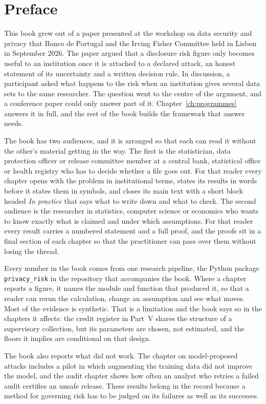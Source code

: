 \chapter{Preface}

This book grew out of a paper presented at the workshop on data security and
privacy that Banco de Portugal and the Irving Fisher Committee held in Lisbon in
September 2026. The paper argued that a disclosure risk figure only becomes useful
to an institution once it is attached to a declared attack, an honest statement of
its uncertainty and a written decision rule. In discussion, a participant asked
what happens to the risk when an institution gives several data sets to the same
researcher. The question went to the centre of the argument, and a conference
paper could only answer part of it. Chapter~\ref{ch:programmes} answers it in
full, and the rest of the book builds the framework that answer needs.

The book has two audiences, and it is arranged so that each can read it without
the other's material getting in the way. The first is the statistician, data
protection officer or release committee member at a central bank, statistical
office or health registry who has to decide whether a file goes out. For that
reader every chapter opens with the problem in institutional terms, states its
results in words before it states them in symbols, and closes its main text with a
short block headed \textit{In practice} that says what to write down and what to
check. The second audience is the researcher in statistics, computer science or
economics who wants to know exactly what is claimed and under which assumptions.
For that reader every result carries a numbered statement and a full proof, and
the proofs sit in a final section of each chapter so that the practitioner can
pass over them without losing the thread.

Every number in the book comes from one research pipeline, the Python
package \texttt{privacy\_risk} in the repository that accompanies the book. Where
a chapter reports a figure, it names the module and function that produced it, so
that a reader can rerun the calculation, change an assumption and see what moves.
Most of the evidence is synthetic. That is a limitation and the book says so
in the chapters it affects: the credit register in Part~V shares the structure of a
supervisory collection, but its parameters are chosen, not estimated, and the
floors it implies are conditional on that design.

The book also reports what did not work. The chapter on model-proposed attacks
includes a pilot in which augmenting the training data did not improve the model,
and the audit chapter shows how often an analyst who retries a failed audit
certifies an unsafe release. These results belong in the record because a method
for governing risk has to be judged on its failures as well as its successes.

